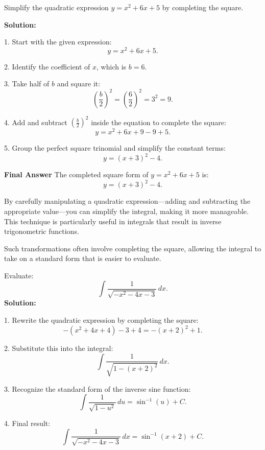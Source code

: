 \documentclass[12pt]{article}
\theoremstyle{beautifulthm}
\begin{document}
\begin{tcolorbox}[colback=examplebg, colframe=red!75!black, title=\textbf{EXAMPLE 3: Completing the Square}, fonttitle=\bfseries, sharp corners]
Simplify the quadratic expression \( y = x^2 + 6x + 5 \) by completing the square.


\tcblower
\textbf{Solution:} 

1. Start with the given expression:
   \[
   y = x^2 + 6x + 5.
   \]

2. Identify the coefficient of \( x \), which is \( b = 6 \).

3. Take half of \( b \) and square it:
   \[
   \left(\frac{b}{2}\right)^2 = \left(\frac{6}{2}\right)^2 = 3^2 = 9.
   \]

4. Add and subtract \( \left(\frac{b}{2}\right)^2 \) inside the equation to complete the square:
   \[
   y = x^2 + 6x + 9 - 9 + 5.
   \]

5. Group the perfect square trinomial and simplify the constant terms:
   \[
   y = (x + 3)^2 - 4.
   \]

\textbf{Final Answer}
The completed square form of \( y = x^2 + 6x + 5 \) is:
\[
y = (x + 3)^2 - 4.
\]

\end{tcolorbox}

\newpage
By carefully manipulating a quadratic expression—adding and subtracting the appropriate value—you can simplify the integral, making it more manageable. This technique is particularly useful in integrals that result in inverse trigonometric functions.

Such transformations often involve completing the square, allowing the integral to take on a standard form that is easier to evaluate.

\begin{tcolorbox}[colback=examplebg, colframe=red!75!black, title=\textbf{EXAMPLE 4: Find the Integral of the Function}, fonttitle=\bfseries, sharp corners]
Evaluate:
\[
\int \frac{1}{\sqrt{-x^2 - 4x - 3}} \, dx.
\]
\tcblower
\textbf{Solution:} 

1. Rewrite the quadratic expression by completing the square:
   \[
   -\left(x^2 + 4x + 4\right) - 3 + 4 = -\left(x + 2\right)^2 + 1.
   \]

2. Substitute this into the integral:
   \[
   \int \frac{1}{\sqrt{1 - \left(x + 2\right)^2}} \, dx.
   \]

3. Recognize the standard form of the inverse sine function:
   \[
   \int \frac{1}{\sqrt{1 - u^2}} \, du = \sin^{-1}(u) + C.
   \]

4. Final result:
   \[
   \int \frac{1}{\sqrt{-x^2 - 4x - 3}} \, dx = \sin^{-1}(x + 2) + C.
   \]
\end{tcolorbox}
\end{document}
